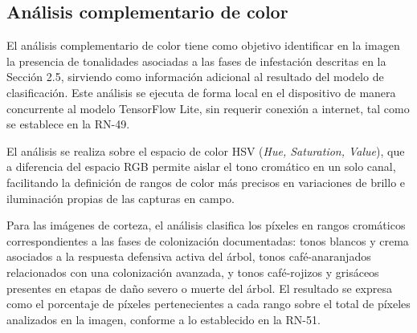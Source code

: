 \subsection{Análisis complementario de color}

El análisis complementario de color tiene como objetivo identificar en la imagen la presencia de tonalidades asociadas a las fases de infestación descritas en la Sección 2.5, sirviendo como información adicional al resultado del modelo de clasificación. Este análisis se ejecuta de forma local en el dispositivo de manera concurrente al modelo TensorFlow Lite, sin requerir conexión a internet, tal como se establece en la RN-49.

El análisis se realiza sobre el espacio de color HSV (\textit{Hue, Saturation, Value}), que a diferencia del espacio RGB permite aislar el tono cromático en un solo canal, facilitando la definición de rangos de color más precisos en variaciones de brillo e iluminación propias de las capturas en campo.

Para las imágenes de corteza, el análisis clasifica los píxeles en rangos cromáticos correspondientes a las fases de colonización documentadas: tonos blancos y crema 
asociados a la respuesta defensiva activa del árbol, tonos café-anaranjados relacionados con una colonización avanzada, y tonos café-rojizos y grisáceos presentes en etapas de daño severo o muerte del árbol. El resultado se expresa como el porcentaje de píxeles pertenecientes a cada rango sobre el total de píxeles analizados en la imagen, conforme a lo establecido en la RN-51.
